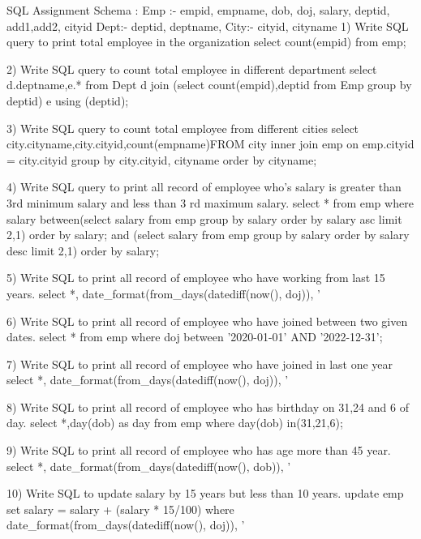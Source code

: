 SQL Assignment
Schema :
Emp :- empid, empname, dob, doj, salary, deptid, add1,add2, cityid
Dept:- deptid, deptname,
City:- cityid, cityname
1) Write SQL query to print total employee in the organization
   select count(empid) from emp;

2) Write SQL query to count total employee in different department
	select d.deptname,e.* from Dept d join (select count(empid),deptid from Emp group by deptid) e using (deptid);
	
3) Write SQL query to count total employee from different cities
    select city.cityname,city.cityid,count(empname)FROM city inner join emp on emp.cityid = city.cityid group by city.cityid, cityname order by cityname;

4) Write SQL query to print all record of employee who’s salary is greater than 3rd
minimum salary and less than 3
rd maximum salary.
	select * from emp where salary between(select salary from emp group by salary order by salary asc limit 2,1) order by salary; and
	(select salary from emp group by salary order by salary desc limit 2,1) order by salary;

5) Write SQL to print all record of employee who have working from last 15 years.
	select *, date_format(from_days(datediff(now(), doj)), '%

6) Write SQL to print all record of employee who have joined between two given dates.
	select  * from emp where doj between '2020-01-01' AND '2022-12-31';

7) Write SQL to print all record of employee who have joined in last one year
	select *, date_format(from_days(datediff(now(), doj)), '%

8) Write SQL to print all record of employee who has birthday on 31,24 and 6 of day.
	select *,day(dob) as day from emp where day(dob) in(31,21,6);


9) Write SQL to print all record of employee who has age more than 45 year.
     select *, date_format(from_days(datediff(now(), dob)), '%

10) Write SQL to update salary by 15%
years but less than 10 years.
	update emp set salary = salary + (salary * 15/100) where date_format(from_days(datediff(now(), doj)), '%

